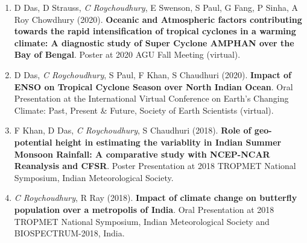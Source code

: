 \documentclass[margin,line]{resume}
\begin{document}
\begin{resume}
\begin{enumerate}[topsep=1pt, partopsep=1pt, itemsep=0.5pt, parsep=0.1pt, leftmargin=15pt,label=\arabic*.]
			\item D Das, D Strauss, \textit{C Roychoudhury}, E Swenson, S Paul, G Fang, P Sinha, A Roy Chowdhury (2020).
			\textbf{Oceanic and Atmospheric factors contributing towards the rapid intensification of tropical cyclones in a warming climate: A diagnostic study of Super Cyclone AMPHAN over the Bay of Bengal}.
			Poster at 2020 AGU Fall Meeting (virtual).
			
			\item D Das, \textit{C Roychoudhury}, S Paul, F Khan, S Chaudhuri (2020). \textbf{Impact of ENSO on Tropical Cyclone Season over North Indian Ocean}. Oral Presentation at the International Virtual Conference on Earth's Changing Climate: Past, Present \& Future, Society of Earth Scientists (virtual).
				
			\item F Khan, D Das, \textit{C Roychoudhury}, S Chaudhuri (2018).		\textbf{Role of geo-potential height in estimating the variablity in Indian Summer Monsoon Rainfall: A comparative study with NCEP-NCAR Reanalysis and CFSR}. Poster Presentation at  %
			2018 TROPMET National Symposium, Indian Meteorological Society.
			
				\item \textit{C Roychoudhury}, R Ray (2018).
			\textbf{Impact of climate change on butterfly population over a metropolis of India}.
				Oral Presentation at %
				2018 TROPMET National Symposium, Indian Meteorological Society and BIOSPECTRUM-2018, India.
			
			

\end{enumerate}
\end{resume}
\end{document}
